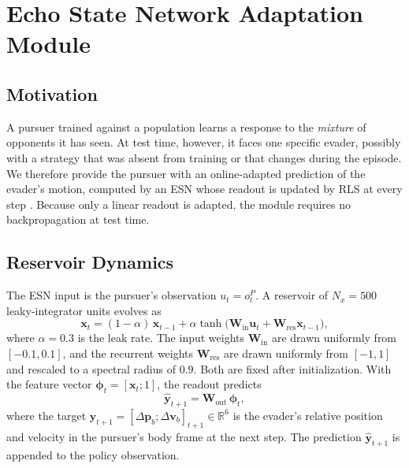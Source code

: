 \section{Echo State Network Adaptation Module}
\label{sec:esn}

\subsection{Motivation}
\noindent
A pursuer trained against a population learns a response to the \emph{mixture} of opponents it has seen. At test time, however, it faces one specific evader, possibly with a strategy that was absent from training or that changes during the episode. We therefore provide the pursuer with an online-adapted prediction of the evader's motion, computed by an ESN whose readout is updated by RLS at every step \cite{yoshimuraOnlineAdaptiveReinforcement2026}. Because only a linear readout is adapted, the module requires no backpropagation at test time.

\subsection{Reservoir Dynamics}
\noindent
The ESN input is the pursuer's observation $u_t = o^P_t$. A reservoir of $N_x = 500$ leaky-integrator units evolves as
\begin{equation}
    \mathbf{x}_t = (1-\alpha)\,\mathbf{x}_{t-1} + \alpha \tanh\!\big(\mathbf{W}_{\text{in}} \mathbf{u}_t + \mathbf{W}_{\text{res}} \mathbf{x}_{t-1}\big),
\end{equation}
where $\alpha = 0.3$ is the leak rate. The input weights $\mathbf{W}_{\text{in}}$ are drawn uniformly from $[-0.1, 0.1]$, and the recurrent weights $\mathbf{W}_{\text{res}}$ are drawn uniformly from $[-1, 1]$ and rescaled to a spectral radius of $0.9$. Both are fixed after initialization. With the feature vector $\boldsymbol{\phi}_t = [\mathbf{x}_t; 1]$, the readout predicts
\begin{equation}
    \hat{\mathbf{y}}_{t+1} = \mathbf{W}_{\text{out}}\, \boldsymbol{\phi}_t,
\end{equation}
where the target $\mathbf{y}_{t+1} = [\Delta\mathbf{p}_b; \Delta\mathbf{v}_b]_{t+1} \in \mathbb{R}^6$ is the evader's relative position and velocity in the pursuer's body frame at the next step. The prediction $\hat{\mathbf{y}}_{t+1}$ is appended to the policy observation.

